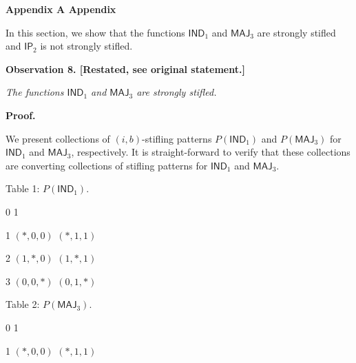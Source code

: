 \documentclass[10pt,a4paper]{article}
\begin{document}
\par\medskip\noindent\textbf{
Appendix A Appendix}\par




In this section, we show that the functions $\mathsf{IND}_{1}$ and $\mathsf{MAJ}_{3}$ are strongly stifled and $\mathsf{IP}_{2}$ is not strongly stifled.\par






\par\medskip\noindent\textbf{
\textbf{Observation 8}\textbf{.}
[Restated, see original statement.]}\par



\emph{The functions $\mathsf{IND}_{1}$ and $\mathsf{MAJ}_{3}$ are strongly stifled.}\par







\par\medskip\noindent\textbf{Proof.}\par




We present collections of $(i,b)$-stifling patterns $P(\mathsf{IND}_{1})$ and $P(\mathsf{MAJ}_{3})$ for $\mathsf{IND}_{1}$ and $\mathsf{MAJ}_{3}$, respectively.
It is straight-forward to verify that these collections are converting collections of stifling patterns for $\mathsf{IND}_{1}$ and $\mathsf{MAJ}_{3}$.\par






Table 1: $P(\mathsf{IND}_{1})$.




0
1




1
$(*,0,0)$
$(*,1,1)$


2
$(1,*,0)$
$(1,*,1)$


3
$(0,0,*)$
$(0,1,*)$







Table 2: $P(\mathsf{MAJ}_{3})$.




0
1




1
$(*,0,0)$
$(*,1,1)$
\end{document}
